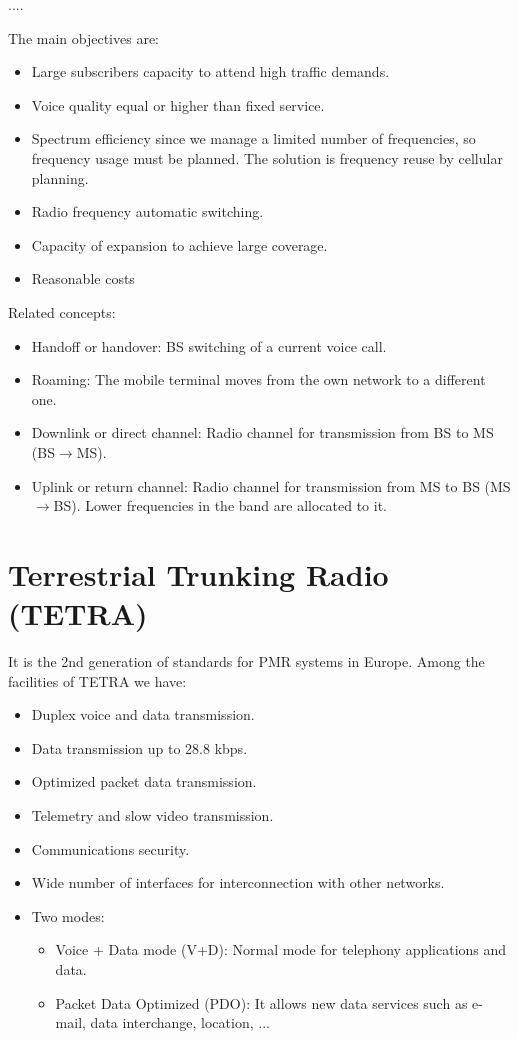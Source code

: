 \documentclass[../main.tex]{subfiles}
\begin{document}
....

The main objectives are:
\begin{itemize}
	\item Large subscribers capacity to attend high traffic demands.
	\item Voice quality equal or higher than fixed service.
	\item Spectrum efficiency since we manage a limited number of frequencies, so frequency usage must be planned. The solution is frequency reuse by cellular planning.
	\item Radio frequency automatic switching.
	\item Capacity of expansion to achieve large coverage.
	\item Reasonable costs
\end{itemize}

Related concepts:
\begin{itemize}
	\item Handoff or handover: BS switching of a current voice call.
	\item Roaming: The mobile terminal moves from the own network to a different one.
	\item Downlink or direct channel: Radio channel for transmission from BS to MS (BS$\rightarrow$MS).
	\item Uplink or return channel: Radio channel for transmission from MS to BS (MS$\rightarrow$BS). Lower frequencies in the band are allocated to it.
\end{itemize}

\section{Terrestrial Trunking Radio (TETRA)}

It is the 2nd generation of standards for PMR systems in Europe. Among the facilities of TETRA we
have:

\begin{itemize}
	\item Duplex voice and data transmission.
	\item Data transmission up to 28.8 kbps.
	\item Optimized packet data transmission.
	\item Telemetry and slow video transmission.
	\item Communications security.
	\item Wide number of interfaces for interconnection with other networks.
	\item {
		Two modes:
		\begin{itemize}
			\item Voice + Data mode (V+D): Normal mode for telephony applications and data.
			\item Packet Data Optimized (PDO): It allows new data services such as e-mail, data interchange, location, ...
		\end{itemize}
	}
\end{itemize}
\end{document}
